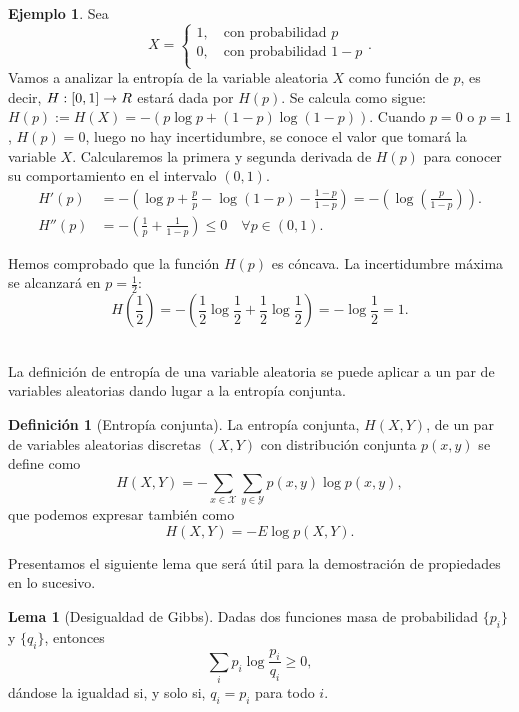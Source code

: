 \documentclass[10pt,a4paper]{article} %
\let\mathbb\relax
\theoremstyle{definition}
\newtheorem{definition}{Definición}[section]
\newtheorem{lemma}[theorem]{Lema}
\newtheorem{example}[theorem]{Ejemplo}
\begin{document}
\begin{example}
  Sea \[X = 
     \begin{cases}
       1, \quad\text{con probabilidad } p\\
       0, \quad\text{con probabilidad } 1-p \\
     \end{cases}.\]
     Vamos a analizar la entropía de la variable aleatoria $X$ como función de $p$, es decir, $H:[0,1]\to \mathbb{R}$ estará dada por $H(p)$. Se calcula como sigue: $ H(p) := H(X) = - \left ( p \log p + (1-p) \log (1-p) \right )$.
     Cuando $p=0$ o $p=1$, $H(p) = 0$, luego no hay incertidumbre, se conoce el valor que tomará la variable $X$. Calcularemos la primera y segunda derivada de $H(p)$ para conocer su comportamiento en el intervalo $(0,1)$.
     \begin{align*}
       H'(p) &= - \left ( \log p + \frac{p}{p} - \log(1-p) - \frac{1-p}{1-p} \right ) = - \left ( \log \left (\frac{p}{1-p} \right) \right ).\\
     H''(p) &= - \left ( \frac{1}{p} + \frac{1}{1-p} \right ) \leq 0 \quad \forall p \in (0,1).
     \end{align*}
     
     Hemos comprobado que la función $H(p)$ es cóncava. La incertidumbre máxima se alcanzará en $p=\frac{1}{2}$: \[H\left (\frac{1}{2}\right ) = - \left ( \frac{1}{2}\log\frac{1}{2} + \frac{1}{2} \log\frac{1}{2} \right ) = - \log \frac{1}{2} = 1.\]\\
\end{example}


La definición de entropía de una variable aleatoria se puede aplicar a un par de variables aleatorias dando lugar a la entropía conjunta.

\begin{definition}[Entropía conjunta]
  La entropía conjunta, $H(X,Y)$, de un par de variables aleatorias discretas $(X,Y)$ con distribución conjunta $p(x,y)$ se define como \[
  H(X,Y) = - \sum_{x \in \mathcal{X}} \sum_{y \in \mathcal{Y}} p(x,y) \log p(x,y), \]
  que podemos expresar también como \[
  H(X,Y) = - E \log p(X,Y).\]
\end{definition}
Presentamos el siguiente lema que será útil para la demostración de propiedades en lo sucesivo.

\begin{lemma}[Desigualdad de Gibbs]\label{l:gibbs}
  Dadas dos funciones masa de probabilidad $\{p_i\}$ y $\{q_i\}$, entonces \[
\sum_i p_i \log \frac{p_i}{q_i} \ge 0,
\]
dándose la igualdad si, y solo si, $q_i = p_i$ para todo $i$.
\end{lemma}
\end{document}
